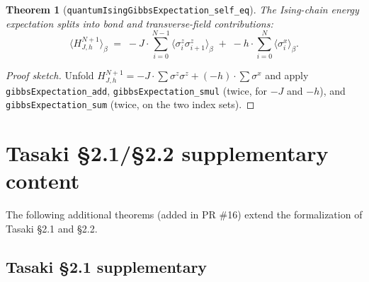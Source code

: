 \documentclass[a4paper,11pt]{article}
\newtheorem{theorem}{Theorem}
\begin{document}
\begin{theorem}[\texttt{quantumIsingGibbsExpectation\_self\_eq}]
The Ising-chain energy expectation splits into bond and
transverse-field contributions:
\[
  \langle H_{J,h}^{N+1} \rangle_\beta
  \;=\;
  -J \cdot \sum_{i=0}^{N-1}
      \langle \sigma^z_i \sigma^z_{i+1} \rangle_\beta
  \;+\;
  -h \cdot \sum_{i=0}^{N}
      \langle \sigma^x_i \rangle_\beta.
\]
\end{theorem}

\begin{proof}[Proof sketch]
Unfold $H_{J,h}^{N+1} = -J \cdot \sum \sigma^z\sigma^z + (-h) \cdot \sum \sigma^x$
and apply
\texttt{gibbsExpectation\_add},
\texttt{gibbsExpectation\_smul} (twice, for $-J$ and $-h$), and
\texttt{gibbsExpectation\_sum} (twice, on the two index sets).
\end{proof}

\section{Tasaki §2.1/§2.2 supplementary content}
\label{sec:supplementary}

The following additional theorems (added in PR \#16) extend the
formalization of Tasaki \S2.1 and \S2.2.

\subsection{Tasaki \S2.1 supplementary}
\end{document}
